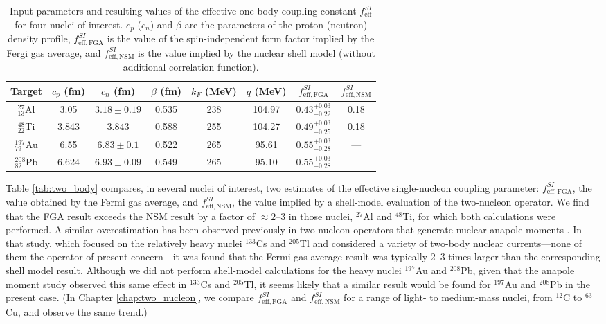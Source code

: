 \documentclass{book}[letterpaper,12pt]
\begin{document}
\begin{table}
\centering
{\renewcommand{\arraystretch}{1.5}
\begin{tabular}{cccccccc}
\hline
\hline
Target & $c_p$ (fm) & $c_n$ (fm) & $\beta$ (fm) & $k_F$ (MeV) & $q$ (MeV)  &  $f_\mathrm{eff,FGA}^{SI}$ & $f_\mathrm{eff,NSM}^{SI}$\\
\hline
$^{27}_{13}$Al & 3.05 & $3.18\pm 0.19$ & 0.535 & 238 & 104.97 & $0.43^{+0.03}_{-0.22}$ & 0.18\\ 
$^{48}_{22}$Ti & 3.843 & $3.843$ & 0.588 & 255 & 104.27 & $0.49^{+0.03}_{-0.25}$ & 0.18\\ 
$^{197}_{79}$Au & 6.55 & $6.83\pm 0.1$ & 0.522 & 265 & 95.61 & $0.55^{+0.03}_{-0.28}$ & ---\\ 
$^{208}_{82}$Pb & 6.624 & $6.93\pm 0.09$ & 0.549 & 265 & 95.10 & $0.55^{+0.03}_{-0.28}$ & ---\\ 
\hline
\hline
\end{tabular}
}
\caption{Input parameters and resulting values of the effective one-body coupling constant $f^{SI}_\mathrm{eff}$ for four nuclei of interest. $c_p$ ($c_n$) and $\beta$ are the parameters of the proton (neutron) density profile, $f^{SI}_\mathrm{eff,FGA}$ is the value of the spin-independent form factor implied by the Fergi gas average, and $f^{SI}_\mathrm{eff,NSM}$ is the value implied by the nuclear shell model (without additional correlation function).}
\label{tab:fga_coherent}
\end{table}

Table \ref{tab:two_body} compares, in several nuclei of interest, two estimates of the effective single-nucleon coupling parameter: $f_\mathrm{eff,FGA}^{SI}$, the value obtained by the Fermi gas average, and $f_\mathrm{eff,NSM}^{SI}$, the value implied by a shell-model evaluation of the two-nucleon operator. We find that the FGA result exceeds the NSM result by a factor of $\approx 2$--$3$ in those nuclei, $^{27}$Al and $^{48}$Ti, for which both calculations were performed. A similar overestimation has been observed previously in two-nucleon operators that generate nuclear anapole moments \cite{2002PhRvC..65d5502H}. In that study, which focused on the relatively heavy nuclei $^{133}$Cs and $^{205}$Tl and considered a variety of two-body nuclear currents---none of them the operator of present concern---it was found that the Fermi gas average result was typically 2--3 times larger than the corresponding shell model result. Although we did not perform shell-model calculations for the heavy nuclei $^{197}$Au and $^{208}$Pb, given that the anapole moment study observed this same effect in $^{133}$Cs and $^{205}$Tl, it seems likely that a similar result would be found for $^{197}$Au and $^{208}$Pb in the present case. (In Chapter \ref{chap:two_nucleon}, we compare $f^{SI}_\mathrm{eff,FGA}$ and $f^{SI}_\mathrm{eff,NSM}$ for a range of light- to medium-mass nuclei, from $^{12}$C to $^{63}$Cu, and observe the same trend.) 
\end{document}
